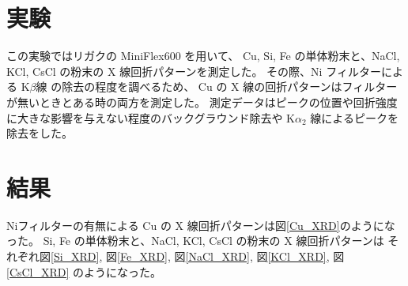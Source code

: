 \documentclass[11pt,dvipdfmx,a4paper]{jsarticle}
\begin{document}
\section{実験}
この実験ではリガクの MiniFlex600 を用いて、
Cu, Si, Fe の単体粉末と、NaCl, KCl, CsCl の粉末の X 線回折パターンを測定した。
その際、Ni フィルターによる K\(\beta\)線 の除去の程度を調べるため、
Cu の X 線の回折パターンはフィルターが無いときとある時の両方を測定した。
測定データはピークの位置や回折強度に大きな影響を与えない程度のバックグラウンド除去や
K\(\alpha_2\) 線によるピークを除去をした。

\section{結果}
Niフィルターの有無による Cu の X 線回折パターンは図\ref{Cu_XRD}のようになった。
Si, Fe の単体粉末と、NaCl, KCl, CsCl の粉末の X 線回折パターンは
それぞれ図\ref{Si_XRD}, 図\ref{Fe_XRD}, 図\ref{NaCl_XRD}, 図\ref{KCl_XRD}, 図\ref{CsCl_XRD} のようになった。
\end{document}
